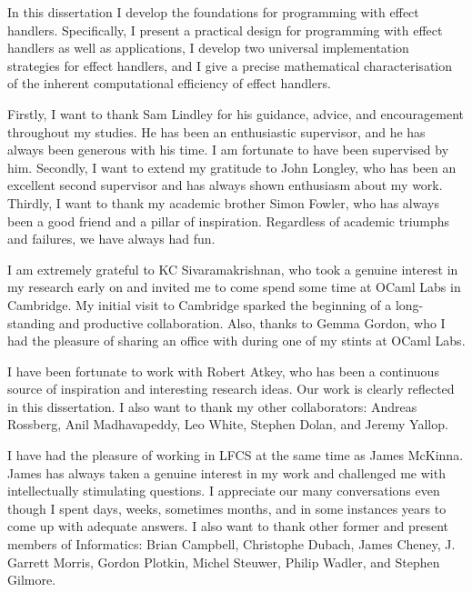 \documentclass[12pt,phd,lfcs,twoside,openright,logo,leftchapter,normalheadings]{infthesis}
\theoremstyle{plain}
\theoremstyle{definition}
\begin{document}
\begin{preliminary}
\begin{laysummary}
  In this dissertation I develop the foundations for programming with
  effect handlers. Specifically, I present a practical design for
  programming with effect handlers as well as applications, I develop
  two universal implementation strategies for effect handlers, and I
  give a precise mathematical characterisation of the inherent
  computational efficiency of effect handlers.
\end{laysummary}

\begin{acknowledgements}
  Firstly, I want to thank Sam Lindley for his guidance, advice, and
  encouragement throughout my studies. He has been an enthusiastic
  supervisor, and he has always been generous with his time. I am
  fortunate to have been supervised by him.
  Secondly, I want to extend my gratitude to John Longley, who has
  been an excellent second supervisor and has always shown enthusiasm
  about my work.
  Thirdly, I want to thank my academic brother Simon Fowler, who has
  always been a good friend and a pillar of inspiration. Regardless of
  academic triumphs and failures, we have always had fun.

  I am extremely grateful to KC Sivaramakrishnan, who took a genuine
  interest in my research early on and invited me to come spend some
  time at OCaml Labs in Cambridge. My initial visit to Cambridge
  sparked the beginning of a long-standing and productive
  collaboration. Also, thanks to Gemma Gordon, who I had the pleasure
  of sharing an office with during one of my stints at OCaml Labs.

  I have been fortunate to work with Robert Atkey, who has been a
  continuous source of inspiration and interesting research ideas. Our
  work is clearly reflected in this dissertation.
  I also want to thank my other collaborators: Andreas Rossberg, Anil
  Madhavapeddy, Leo White, Stephen Dolan, and Jeremy Yallop.

  I have had the pleasure of working in LFCS at the same time as James
  McKinna. James has always taken a genuine interest in my work and
  challenged me with intellectually stimulating questions. I
  appreciate our many conversations even though I spent days, weeks,
  sometimes months, and in some instances years to come up with
  adequate answers. I also want to thank other former and present
  members of Informatics: Brian Campbell, Christophe Dubach, James
  Cheney, J. Garrett Morris, Gordon Plotkin, Michel Steuwer, Philip
  Wadler, and Stephen Gilmore.


\end{acknowledgements}
\end{preliminary}
\end{document}
